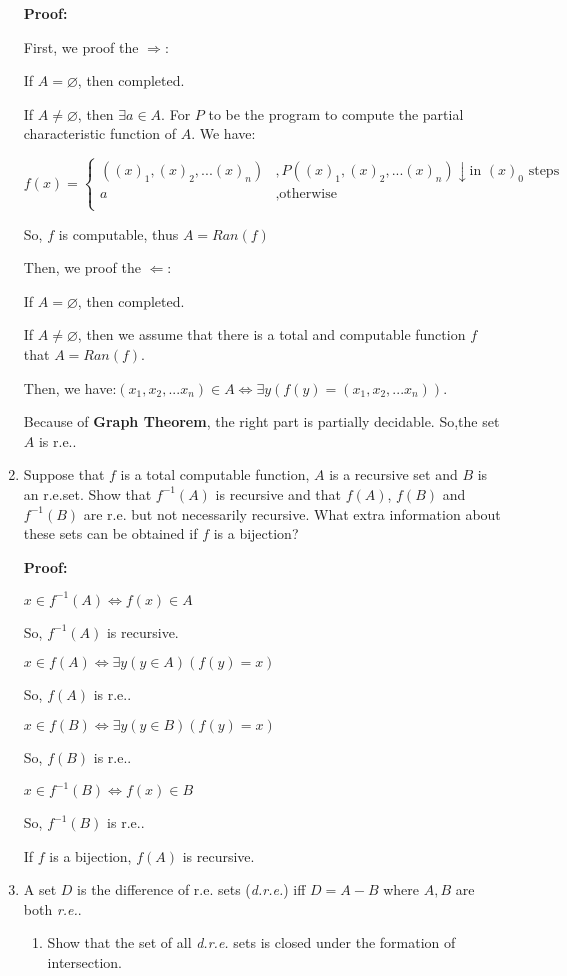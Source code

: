 \documentclass[12pt,a4paper]{article}
\theoremstyle{definition}
\numberwithin{equation}{section}
\numberwithin{figure}{section}
\begin{document}
\begin{enumerate}
\textbf{Proof:}

First, we proof the $\Rightarrow$:

If $A = \varnothing $, then completed.

If $A \neq \varnothing$, then $\exists a \in A$. For $P$ to be the program to compute the partial characteristic function of $A$. We have:

$$f(x) = \begin{cases} ((x)_1,(x)_2,...(x)_n) &, P((x)_1,(x)_2,...(x)_n) \downarrow \mbox{in } (x)_0 \mbox{ steps}\\
 a &, \mbox{otherwise} \\
 \end{cases}$$
 
 So, $f$ is computable, thus $A = Ran(f)$

Then, we proof the $\Leftarrow:$

If $A = \varnothing $, then completed.

If $A \neq \varnothing$, then we assume that there is a total and computable function $f$ that $A = Ran(f)$.

Then, we have:$(x_1,x_2,...x_n) \in A \Leftrightarrow \exists y(f(y) = (x_1,x_2,...x_n))$.

Because of \textbf{Graph Theorem}, the right part is partially decidable. So,the set $A$ is r.e..


\item Suppose that $f$ is a total computable function, $A$ is a recursive set and $B$ is an r.e.set. Show that $f^{-1}(A)$ is recursive and that $f(A)$, $f(B)$ and $f^{-1}(B)$ are r.e. but not necessarily recursive. What extra information about these sets can be obtained if $f$ is a bijection?

\textbf{Proof:}

$x \in f^{-1}(A) \Leftrightarrow f(x) \in A$

So, $f^{-1}(A)$ is recursive.

$x \in f(A) \Leftrightarrow \exists y(y \in A)(f(y) = x)$

So, $f(A)$ is r.e..

$x \in f(B) \Leftrightarrow \exists y(y \in B)(f(y) = x)$

So, $f(B)$ is r.e..

$x \in f^{-1}(B) \Leftrightarrow f(x) \in B$

So, $f^{-1}(B)$ is r.e..

If $f$ is a bijection, $f(A)$ is recursive.

\item A set $D$ is the difference of r.e. sets (\emph{d.r.e.}) iff $D=A-B$ where $A,B$ are both \emph{r.e.}.
\begin{enumerate}
\item Show that the set of all \emph{d.r.e.} sets is closed under the formation of intersection.


\end{enumerate}
\end{enumerate}
\end{document}
